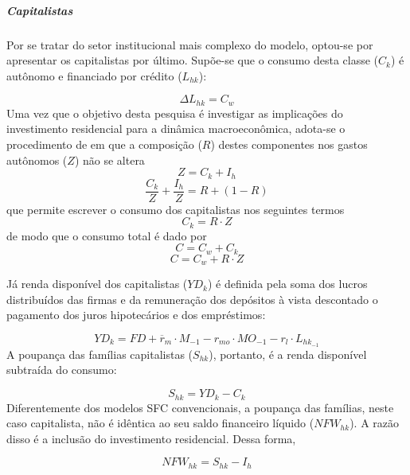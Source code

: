 \subparagraph*{Capitalistas}

Por se tratar do setor institucional mais complexo do modelo, optou-se por apresentar os capitalistas por último. Supõe-se que o consumo desta classe ($C_k$) é autônomo e financiado por crédito ($L_{hk}$):

\begin{equation}
\Delta L_{hk} = C_w
\end{equation}
Uma vez que o objetivo desta pesquisa é investigar as implicações do investimento residencial para a dinâmica macroeconômica, adota-se o procedimento de \textcite{freitas_baseline_2019} em que a composição ($R$) destes componentes nos gastos autônomos ($Z$) não se altera
\begin{equation}
\label{_Z}
Z = C_k + I_h
\end{equation}
$$
\frac{C_k}{Z} + \frac{I_h}{Z} = R + (1-R)
$$
que permite escrever o consumo dos capitalistas nos seguintes termos
\begin{equation}
\label{_Ck}
    C_k = R\cdot Z
\end{equation}
de modo que o consumo total é dado por
\begin{equation}
\label{ConsumoTotal}
C = C_w + C_k
\end{equation}
$$
C = C_w + R\cdot Z
$$

Já renda disponível dos capitalistas ($YD_k$) é definida pela soma dos lucros distribuídos das firmas e da remuneração dos depósitos à vista descontado o pagamento dos juros hipotecários e dos empréstimos:

\begin{equation}
    \label{EqYD}
    YD_k = FD + \overline r_m\cdot M_{-1} - r_{mo}\cdot MO_{-1} - r_{l}\cdot L_{hk_{-1}}
\end{equation}
A poupança das famílias capitalistas ($S_{hk}$), portanto, é a renda disponível subtraída do consumo:

\begin{equation}
    \label{EqSh}
    S_{hk} = YD_k - C_k
\end{equation}
Diferentemente dos modelos SFC convencionais, a poupança das famílias, neste caso capitalista,  não é idêntica ao seu saldo financeiro líquido ($NFW_{hk}$). A razão disso é a inclusão do investimento residencial. Dessa forma, 

\begin{equation}
\label{NFWh}
    NFW_{hk} = S_{hk} - I_h
\end{equation}

